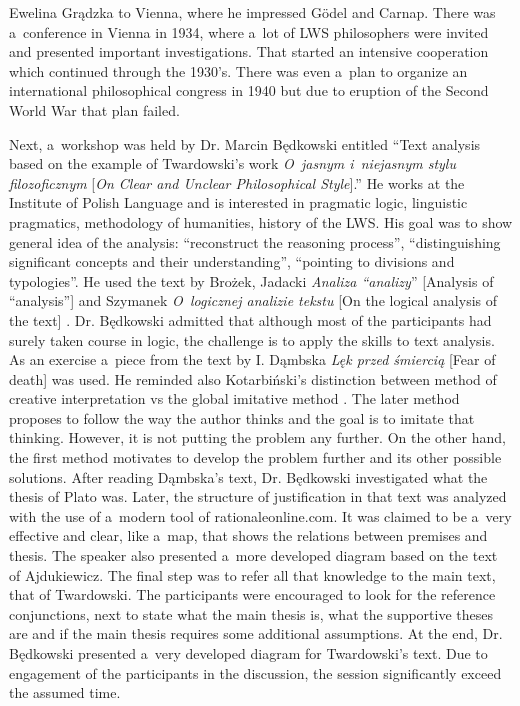 \begin{editorialeng}{Ewelina Grądzka}
to Vienna, where he impressed Gödel and Carnap. There was a~conference in Vienna in 1934, where a~lot of LWS philosophers were invited and presented important investigations. That started an intensive cooperation which continued through the 1930’s. There was even a~plan to organize an international philosophical congress in 1940 but due to eruption of the Second World War that plan failed.

Next, a~workshop was held by Dr. Marcin Będkowski entitled “Text analysis based on the example of Twardowski’s work \textit{O~jasnym i~niejasnym stylu filozoficznym} [\textit{On Clear and Unclear Philosophical Style}].”
\parencites[][]{twardowski_o_1927}[][eng. transl.]{brandl_clear_1999} %
 He works at the Institute of Polish Language and is interested in pragmatic logic, linguistic pragmatics, methodology of humanities, history of the LWS. His goal was to show general idea of the analysis: “reconstruct the reasoning process”, “distinguishing significant concepts and their understanding”, “pointing to divisions and typologies”. He used the text by Brożek, Jadacki \textit{Analiza “analizy}” [Analysis of “analysis”] 
\parencite*[][]{brozek_analiza_2006} %
 and Szymanek \textit{O~logicznej analizie tekstu} [On the logical analysis of the text] 
\parencite*[][]{szymanek_o_2010}. %
 Dr. Będkowski admitted that although most of the participants had surely taken course in logic, the challenge is to apply the skills to text analysis. As an exercise a~piece from the text by I. Dąmbska \textit{Lęk przed śmiercią} [Fear of death] was used. He reminded also Kotarbiński’s distinction between method of creative interpretation vs the global imitative method 
\parencite[][cf.]{kotarbinski_praxiology_1965}. %
 The later method proposes to follow the way the author thinks and the goal is to imitate that thinking. However, it is not putting the problem any further. On the other hand, the first method motivates to develop the problem further and its other possible solutions. After reading Dąmbska’s text, Dr. Będkowski investigated what the thesis of Plato was. Later, the structure of justification in that text was analyzed with the use of a~modern tool of rationaleonline.com. It was claimed to be a~very effective and clear, like a~map, that shows the relations between premises and thesis. The speaker also presented a~more developed diagram based on the text of Ajdukiewicz. The final step was to refer all that knowledge to the main text, that of Twardowski. The participants were encouraged to look for the reference conjunctions, next to state what the main thesis is, what the supportive theses are and if the main thesis requires some additional assumptions. At the end, Dr. Będkowski presented a~very developed diagram for Twardowski’s text. Due to engagement of the participants in the discussion, the session significantly exceed the assumed time.


\end{editorialeng}
